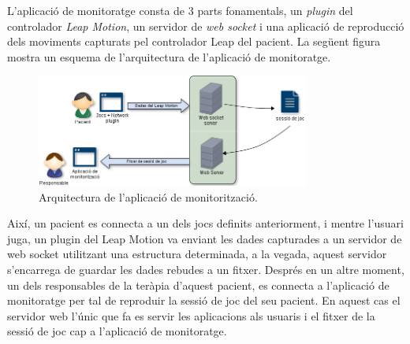 \documentclass[12pt,a4paper,catalan]{article}
\begin{document}
	L'aplicació de monitoratge consta de 3 parts fonamentals, un \textit{plugin} del controlador \textit{Leap Motion}, un servidor de \textit{web socket} i una aplicació de reproducció dels moviments capturats pel controlador Leap del pacient. La següent figura mostra un esquema de l'arquitectura de l'aplicació de monitoratge.
	\begin{figure}[H]
		\includegraphics[width=0.8\textwidth,keepaspectratio]{esquema-monitoritzacio.png}
		\centering
		\caption{Arquitectura de l'aplicació de monitorització.}
		\label{fig:arquitectura-monitoratge}
	\end{figure}
	Així, un pacient es connecta a un dels jocs definits anteriorment, i mentre l'usuari juga, un plugin del Leap Motion va enviant les dades capturades a un servidor de web socket utilitzant una estructura determinada, a la vegada, aquest servidor s'encarrega de guardar les dades rebudes a un fitxer. Després en un altre moment, un dels responsables de la teràpia d'aquest pacient, es connecta a l'aplicació de monitoratge per tal de reproduir la sessió de joc del seu pacient. En aquest cas el servidor web l'únic que fa es servir les aplicacions als usuaris i el fitxer de la sessió de joc cap a l'aplicació de monitoratge.
\end{document}
